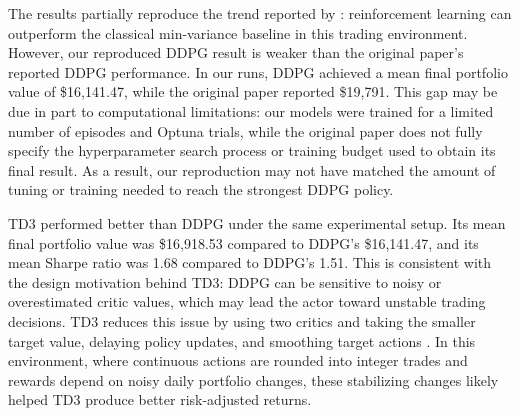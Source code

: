 \documentclass{article}
\begin{document}
\begin{table}[t]
\centering
\caption{Trading performance on the 2016--2018 test period. RL results are reported as mean across seeds, with standard deviation in parentheses.}
\label{tab:trading_results}
\end{table}

The results partially reproduce the trend reported by \cite{liu2018practical}: reinforcement learning can outperform the classical min-variance baseline in this trading environment. However, our reproduced DDPG result is weaker than the original paper's reported DDPG performance. In our runs, DDPG achieved a mean final portfolio value of \$16{,}141.47, while the original paper reported \$19{,}791. This gap may be due in part to computational limitations: our models were trained for a limited number of episodes and Optuna trials, while the original paper does not fully specify the hyperparameter search process or training budget used to obtain its final result. As a result, our reproduction may not have matched the amount of tuning or training needed to reach the strongest DDPG policy.

TD3 performed better than DDPG under the same experimental setup. Its mean final portfolio value was \$16{,}918.53 compared to DDPG's \$16{,}141.47, and its mean Sharpe ratio was 1.68 compared to DDPG's 1.51. This is consistent with the design motivation behind TD3: DDPG can be sensitive to noisy or overestimated critic values, which may lead the actor toward unstable trading decisions. TD3 reduces this issue by using two critics and taking the smaller target value, delaying policy updates, and smoothing target actions \cite{fujimoto2018}. In this environment, where continuous actions are rounded into integer trades and rewards depend on noisy daily portfolio changes, these stabilizing changes likely helped TD3 produce better risk-adjusted returns.
\end{document}
